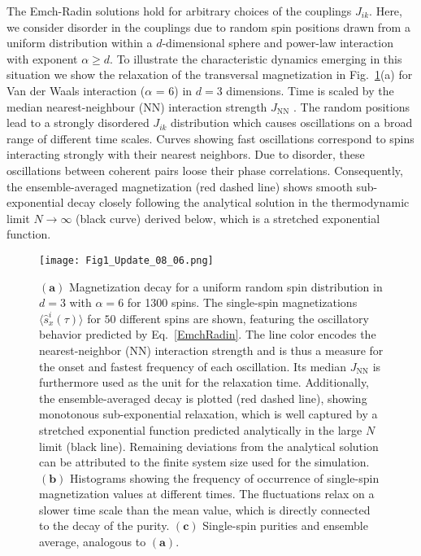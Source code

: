 \documentclass[aps,twocolumn,
superscriptaddress,
footinbib,
prl]{revtex4-1}
\begin{document}
The Emch-Radin solutions hold for arbitrary choices of the couplings $J_{ik}$. 
Here, we consider disorder in the couplings due to random spin positions drawn from a uniform distribution within a $d$-dimensional sphere and power-law interaction with exponent $\alpha \geq d$. To illustrate the characteristic dynamics emerging in this situation we show the relaxation of the transversal magnetization in Fig.~\ref{figure1}(a) for  Van der Waals interaction ($\alpha$ = 6) in $d=3$ dimensions. Time is scaled by the median nearest-neighbour (NN) interaction strength $J_{\mathrm{NN}}$ \cite{Signoles2021GlassySystem}. The random positions lead to a strongly disordered $J_{ik}$ distribution which causes oscillations on a broad range of different time scales. Curves showing fast oscillations correspond to spins interacting strongly with their nearest neighbors. Due to disorder, these oscillations between coherent pairs loose their phase correlations. Consequently, the ensemble-averaged magnetization (red dashed line) shows smooth sub-exponential decay closely following the analytical solution in the thermodynamic limit $N \rightarrow \infty$ (black curve) derived below, which is a stretched exponential function.


\begin{figure}
\texttt{[image: Fig1\_Update\_08\_06.png]}
\caption{$\bm{(a)}$ Magnetization decay for a uniform random spin distribution in $d=3$ with $\alpha = 6$ for 1300 spins. The single-spin magnetizations $\langle\hat s_x^i(\tau)\rangle$ for $50$ different spins are shown, featuring the oscillatory behavior predicted by Eq.~\eqref{EmchRadin}. The line color encodes the nearest-neighbor (NN) interaction strength and is thus a measure for the onset and fastest frequency of each oscillation. Its median $J_{\mathrm{NN}}$ is furthermore used as the unit for the relaxation time. Additionally, the ensemble-averaged decay is plotted (red dashed line), showing monotonous sub-exponential relaxation, which is well captured by a stretched exponential function predicted analytically in the large $N$ limit (black line). Remaining deviations from the analytical solution can be attributed to the finite system size used for the simulation. $\bm{(b)}$ Histograms showing the frequency of occurrence of single-spin magnetization values at different times. The fluctuations relax on a slower time scale than the mean value, which is directly connected to the decay of the purity. $\bm{(c)}$ Single-spin purities and ensemble average, analogous to $\bm{(a)}$.}
\label{figure1}
\end{figure}
\end{document}
